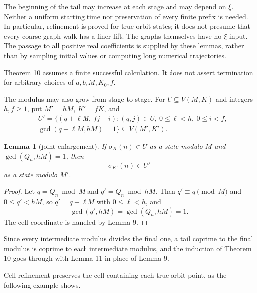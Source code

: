 \documentclass[11pt,reqno]{amsart}
\newtheorem{lemma}[theorem]{Lemma}
\theoremstyle{definition}
\theoremstyle{remark}
\begin{document}
The beginning of the tail may increase at each stage and may depend on
\(\xi\). Neither a uniform starting time nor preservation of every finite
prefix is needed. In particular, refinement is proved for true orbit
states; it does not presume that every coarse graph walk has a finer lift.
The graphs themselves have no \(\xi\) input. The passage to all positive
real coefficients is supplied by these lemmas, rather than by sampling
initial values or computing long numerical trajectories.

Theorem 10 assumes a finite successful calculation. It does not assert
termination for arbitrary choices of \(a,b,M,K_0,f\).

The modulus may also grow from stage to stage. For \(U\subseteq V(M,K)\)
and integers \(h,f\ge1\), put \(M'=hM\), \(K'=fK\), and
\[\begin{aligned}
&U'=\{(q+\ell M,\ fj+i):(q,j)\in U,\ 0\le\ell<h,\ 0\le i<f,\\\
&\gcd(q+\ell M,hM)=1\}\subseteq V(M',K').
\end{aligned}\]

\begin{samepage}
\begin{lemma}[joint enlargement]\leavevmode\label{thm:11}
If \(\sigma_K(n)\in U\) as a state
modulo \(M\) and \(\gcd(Q_n,hM)=1\), then
\[
\sigma_{K'}(n)\in U'
\]
as a
state modulo \(M'\).
\label{thm-end:11}
\end{lemma}
\end{samepage}

\begin{proof}\leavevmode\label{proof:11}
Let \(q=Q_n\bmod M\) and \(q'=Q_n\bmod hM\). Then
\(q'\equiv q\pmod M\) and \(0\le q'<hM\), so \(q'=q+\ell M\) with
\(0\le\ell<h\), and
\[
\gcd(q',hM)=\gcd(Q_n,hM)=1.
\]
The cell coordinate
is handled by Lemma 9. \qedhere
\end{proof}

Since every intermediate modulus divides the final one, a tail coprime to
the final modulus is coprime to each intermediate modulus, and the
induction of Theorem 10 goes through with Lemma 11 in place of Lemma 9.

Cell refinement preserves the cell containing each true orbit point, as the following example shows.
\end{document}
